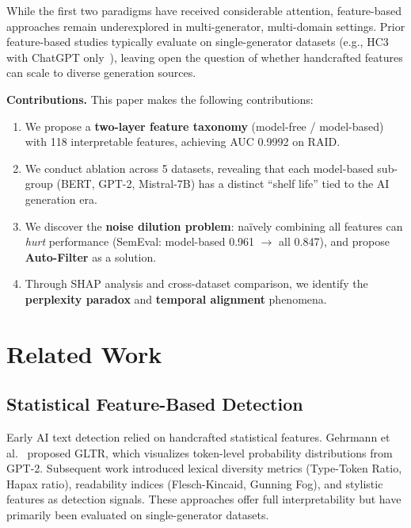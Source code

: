 \documentclass[sigconf,nonacm]{acmart}
\begin{document}
While the first two paradigms have received considerable attention, feature-based approaches remain underexplored in multi-generator, multi-domain settings. Prior feature-based studies typically evaluate on single-generator datasets (e.g., HC3 with ChatGPT only~\cite{gao2023hc3}), leaving open the question of whether handcrafted features can scale to diverse generation sources.

\textbf{Contributions.} This paper makes the following contributions:

\begin{enumerate}
    \item We propose a \textbf{two-layer feature taxonomy} (model-free / model-based) with 118 interpretable features, achieving AUC 0.9992 on RAID.
    \item We conduct ablation across 5 datasets, revealing that each model-based sub-group (BERT, GPT-2, Mistral-7B) has a distinct ``shelf life'' tied to the AI generation era.
    \item We discover the \textbf{noise dilution problem}: na\"{i}vely combining all features can \emph{hurt} performance (SemEval: model-based 0.961 $\rightarrow$ all 0.847), and propose \textbf{Auto-Filter} as a solution.
    \item Through SHAP analysis and cross-dataset comparison, we identify the \textbf{perplexity paradox} and \textbf{temporal alignment} phenomena.
\end{enumerate}

\section{Related Work}

\subsection{Statistical Feature-Based Detection}

Early AI text detection relied on handcrafted statistical features. Gehrmann et al.~\cite{gehrmann2019gltr} proposed GLTR, which visualizes token-level probability distributions from GPT-2. Subsequent work introduced lexical diversity metrics (Type-Token Ratio, Hapax ratio), readability indices (Flesch-Kincaid, Gunning Fog), and stylistic features as detection signals. These approaches offer full interpretability but have primarily been evaluated on single-generator datasets.
\end{document}
